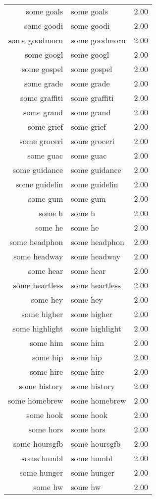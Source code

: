 \begin{table}[ht]
\begin{tabular}{rlr}
  some goals & some goals & 2.00 \\ 
  some goodi & some goodi & 2.00 \\ 
  some goodmorn & some goodmorn & 2.00 \\ 
  some googl & some googl & 2.00 \\ 
  some gospel & some gospel & 2.00 \\ 
  some grade & some grade & 2.00 \\ 
  some graffiti & some graffiti & 2.00 \\ 
  some grand & some grand & 2.00 \\ 
  some grief & some grief & 2.00 \\ 
  some groceri & some groceri & 2.00 \\ 
  some guac & some guac & 2.00 \\ 
  some guidance & some guidance & 2.00 \\ 
  some guidelin & some guidelin & 2.00 \\ 
  some gum & some gum & 2.00 \\ 
  some h & some h & 2.00 \\ 
  some he & some he & 2.00 \\ 
  some headphon & some headphon & 2.00 \\ 
  some headway & some headway & 2.00 \\ 
  some hear & some hear & 2.00 \\ 
  some heartless & some heartless & 2.00 \\ 
  some hey & some hey & 2.00 \\ 
  some higher & some higher & 2.00 \\ 
  some highlight & some highlight & 2.00 \\ 
  some him & some him & 2.00 \\ 
  some hip & some hip & 2.00 \\ 
  some hire & some hire & 2.00 \\ 
  some history & some history & 2.00 \\ 
  some homebrew & some homebrew & 2.00 \\ 
  some hook & some hook & 2.00 \\ 
  some hors & some hors & 2.00 \\ 
  some hoursgfb & some hoursgfb & 2.00 \\ 
  some humbl & some humbl & 2.00 \\ 
  some hunger & some hunger & 2.00 \\ 
  some hw & some hw & 2.00 \\ 

\end{tabular}
\end{table}
